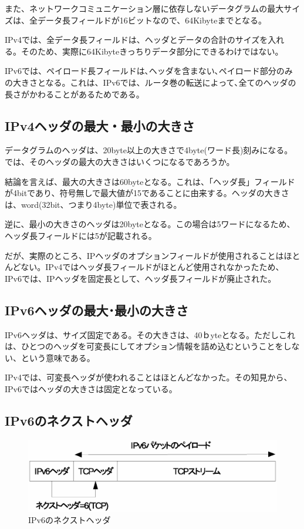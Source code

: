 また、ネットワークコミュニケーション層に依存しないデータグラムの最大サイズは、全データ長フィールドが16ビットなので、64Kibyteまでとなる。

IPv4では、全データ長フィールドは、ヘッダとデータの合計のサイズを入れる。そのため、実際に64Kibyteきっちりデータ部分にできるわけではない。

IPv6では、ペイロード長フィールドは､ヘッダを含まない､ペイロード部分のみの大きさとなる。これは、IPv6では、ルータ巻の転送によって､全てのヘッダの長さがかわることがあるためである。


\subsection{IPv4ヘッダの最大・最小の大きさ}

データグラムのヘッダは、20byte以上の大きさで4byte(ワード長)刻みになる。では、そのヘッダの最大の大きさはいくつになるであろうか。

結論を言えば、最大の大きさは60byteとなる。これは、「ヘッダ長」フィールドが4bitであり、符号無しで最大値が15であることに由来する。ヘッダの大きさは、word(32bit、つまり4byte)単位で表される。

逆に、最小の大きさのヘッダは20byteとなる。この場合は5ワードになるため、ヘッダ長フィールドには5が記載される。

だが、実際のところ、IPヘッダのオプションフィールドが使用されることはほとんどない。IPv4ではヘッダ長フィールドがほとんど使用されなかったため、 IPv6では、IPヘッダを固定長として、ヘッダ長フィールドが廃止された。

\subsection{IPv6ヘッダの最大･最小の大きさ}
IPv6ヘッダは、サイズ固定である。その大きさは、40ｂyteとなる。ただしこれは、ひとつのヘッダを可変長にしてオプション情報を詰め込むということをしない、という意味である。

IPv4では、可変長ヘッダが使われることはほとんどなかった。その知見から、IPv6ではヘッダの大きさは固定となっている。

\subsection{IPv6のネクストヘッダ}
\begin{figure}
	\includegraphics[width=14cm,clip]{draw/nextheader1.eps}
	\caption{IPv6のネクストヘッダ}
	\label{fig:ipv6nextheader}
\end{figure}

